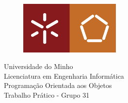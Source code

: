 \begin{titlepage}
    \centering
    \fontsize{25}{0}\selectfont
    
    \begin{figure}
        \centering
        \includegraphics[width=0.45\textwidth]{imagens/uminho.png}
        \caption*{}
    \end{figure}

    Universidade do Minho \\
    \Large Licenciatura em Engenharia Informática \\
    
    \vspace*{1.5cm}
    \Large Programação Orientada aos Objetos \\ 
    \Large Trabalho Prático - Grupo 31

    \vspace*{1.5cm}


\end{titlepage}
